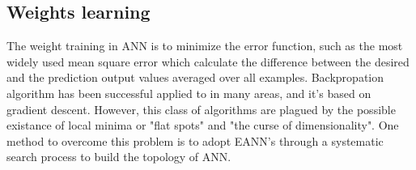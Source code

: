 

\subsection{Weights learning}
The weight training in ANN is to minimize the error function, such as the most
widely used mean square error which calculate the difference  between the
desired and the prediction output values averaged over all examples.
Backpropation algorithm has been successful applied to in many areas, and it's
based on gradient descent. However, this class of algorithms are  plagued by
the possible existance of local minima or "flat spots" and "the curse of
dimensionality". One method to overcome this problem is to adopt
EANN's\cite{yao1999evolving} through a systematic search process\cite{elsken2019neural} to build
the topology of ANN.







